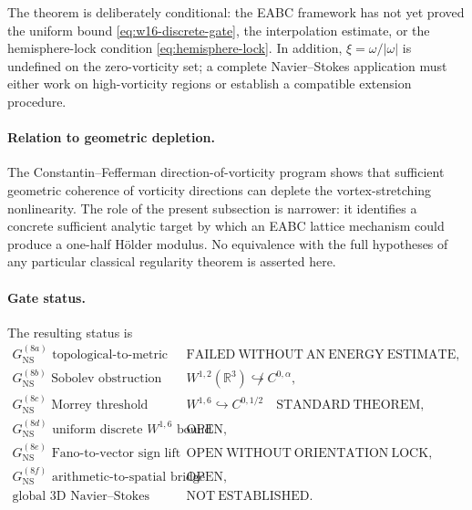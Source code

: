 \documentclass{article}
\begin{document}
The theorem is deliberately conditional: the EABC framework has not yet
proved the uniform bound \eqref{eq:w16-discrete-gate}, the interpolation
estimate, or the hemisphere-lock condition \eqref{eq:hemisphere-lock}.  In
addition, $\xi=\omega/|\omega|$ is undefined on the zero-vorticity set; a
complete Navier--Stokes application must either work on high-vorticity regions
or establish a compatible extension procedure.

\paragraph{Relation to geometric depletion.}
The Constantin--Fefferman direction-of-vorticity program shows that sufficient
geometric coherence of vorticity directions can deplete the vortex-stretching
nonlinearity.  The role of the present subsection is narrower: it identifies a
concrete sufficient analytic target by which an EABC lattice mechanism could
produce a one-half Hölder modulus.  No equivalence with the full hypotheses of
any particular classical regularity theorem is asserted here.

\paragraph{Gate status.}
The resulting status is
\[
\boxed{
\begin{array}{ll}
G_{\mathrm{NS}}^{(8a)}\text{ topological-to-metric implication}
  & \mathrm{FAILED\ WITHOUT\ AN\ ENERGY\ ESTIMATE},\\
G_{\mathrm{NS}}^{(8b)}\text{ Sobolev obstruction}
  & W^{1,2}(\mathbb R^3)\not\hookrightarrow C^{0,\alpha},\\
G_{\mathrm{NS}}^{(8c)}\text{ Morrey threshold}
  & W^{1,6}\hookrightarrow C^{0,1/2}\quad\mathrm{STANDARD\ THEOREM},\\
G_{\mathrm{NS}}^{(8d)}\text{ uniform discrete }W^{1,6}\text{ bound}
  & \mathrm{OPEN},\\
G_{\mathrm{NS}}^{(8e)}\text{ Fano-to-vector sign lift}
  & \mathrm{OPEN\ WITHOUT\ ORIENTATION\ LOCK},\\
G_{\mathrm{NS}}^{(8f)}\text{ arithmetic-to-spatial bridge}
  & \mathrm{OPEN},\\
\text{global 3D Navier--Stokes regularity}
  & \mathrm{NOT\ ESTABLISHED}.
\end{array}}
\]


\end{document}
